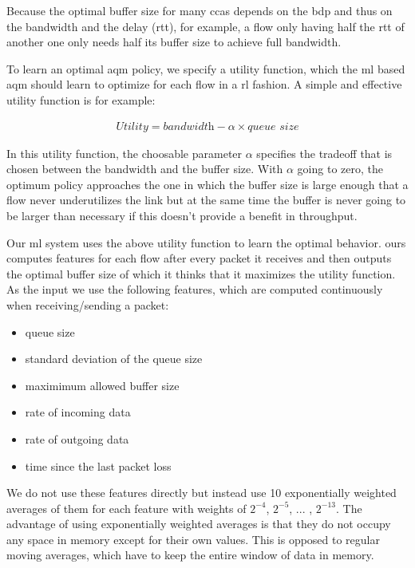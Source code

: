 \documentclass[conference]{IEEEtran}
\begin{document}
Because the optimal buffer size for many \glspl{cca} depends on the \gls{bdp} and thus on the bandwidth and the delay (\gls{rtt}), for example, a flow only having half the \gls{rtt} of another one only needs half its buffer size to achieve full bandwidth. 

To learn an optimal \gls{aqm} policy, we specify a utility function, which the \gls{ml} based \gls{aqm} should learn to optimize for each flow in a \gls{rl} fashion. A simple and effective utility function is for example:

\begin{align}
\textit{Utility} = \textit{bandwidth}-\alpha\times\textit{queue size}
\label{eq:utility}
\end{align}

In this utility function, the choosable parameter $\alpha$ specifies the tradeoff that is chosen between the bandwidth and the buffer size. With $\alpha$ going to zero, the optimum policy approaches the one in which the buffer size is large enough that a flow never underutilizes the link but at the same time the buffer is never going to be larger than necessary if this doesn't provide a benefit in throughput. 

Our \gls{ml} system uses the above utility function to learn the optimal behavior. \gls{ours} computes features for each flow after every packet it receives and then outputs the optimal buffer size of which it thinks that it maximizes the utility function. As the input we use the following features, which are computed continuously when receiving/sending a packet: 
\begin{itemize}
\item queue size
\item standard deviation of the queue size 
\item maximimum allowed buffer size
\item rate of incoming data
\item rate of outgoing data
\item time since the last packet loss
\end{itemize}
We do not use these features directly but instead use 10 exponentially weighted averages of them for each feature with weights of $2^{-4}$, $2^{-5}$, ... , $2^{-13}$. The advantage of using exponentially weighted averages is that they do not occupy any space in memory except for their own values. This is opposed to regular moving averages, which have to keep the entire window of data in memory. 
\end{document}
